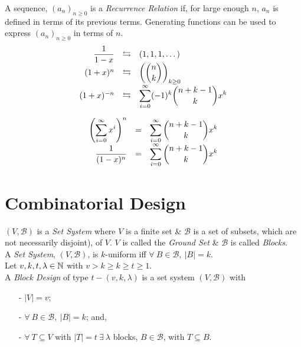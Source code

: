 \documentclass[11pt,a4paper]{article}
\begin{document}
A sequence, $(a_n)_{n\geq0}$ is a \textit{Recurrence Relation} if, for large enough $n$, $a_n$ is defined in terms of its previous terms. Generating functions can be used to express $(a_n)_{n\geq0}$ in terms of $n$.\\

\[\begin{array}{rcl}
\dfrac{1}{1-x}&\leftrightarrows&(1,1,1,\dots)\\
(1+x)^n&\leftrightarrows&\left(\displaystyle{{{n}\choose{k}}}\right)_{k\geq0}\\
(1+x)^{-n}&\leftrightarrows&\displaystyle{\sum_{i=0}^\infty(-1)^k\displaystyle{{{n+k-1}\choose{k}}}x^k}\\
\end{array}\]

\[\begin{array}{rcl}
\displaystyle{\left(\sum_{i=0}^\infty x^i\right)^n}&=&\displaystyle{\sum_{i=0}^\infty\displaystyle{{{n+k-1}\choose{k}}}x^k}\\
\dfrac{1}{(1-x)^n}&=&\displaystyle{\sum_{i=0}^\infty\displaystyle{{{n+k-1}\choose{k}}}x^k}
\end{array}\]

\section{Combinatorial Design}

$(V,\mathcal{B})$ is a \textit{Set System} where $V$ is a finite set \& $\mathcal{B}$ is a set of subsets, which are not necessarily disjoint), of $V$. $V$ is called the \textit{Ground Set} \& $\mathcal{B}$ is called \textit{Blocks}.\\

A \textit{Set System}, $(V,\mathcal{B})$, is $k$-uniform iff $\forall\ B\in\mathcal{B},\ |B|=k$.\\

Let $v,k,t,\lambda\in\mathbb{N}$ with $v>k\geq k\geq t\geq 1$.\\
A \textit{Block Design} of type $t-(v,k,\lambda)$ is a set system $(V,\mathcal{B})$ with
\begin{itemize}
	\item[-] $|V|=v$;
	\item[-] $\forall\ B\in\mathcal{B},\ |B|=k$; and,
	\item[-] $\forall\ T\subseteq V$ with $|T|=t\ \exists\ \lambda$ blocks, $B\in\mathcal{B}$, with $T\subseteq B$.
\end{itemize}
\end{document}
